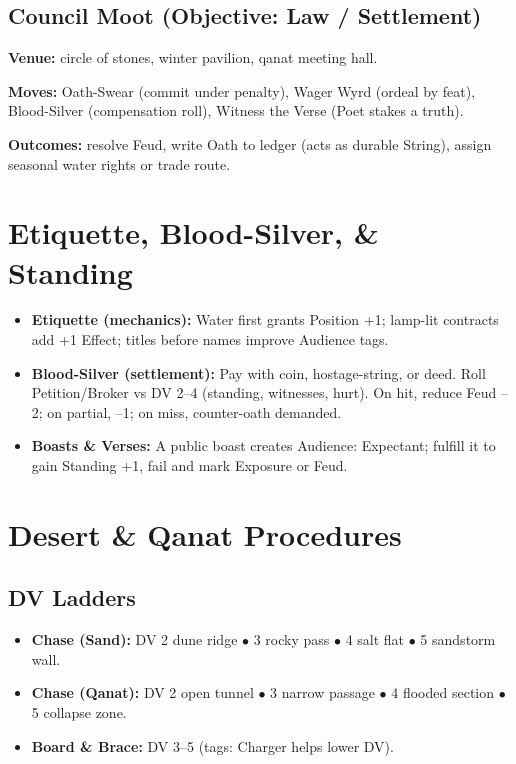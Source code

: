\documentclass[11pt]{article}
\begin{document}
\subsection{Council Moot (Objective: Law / Settlement)}

\textbf{Venue:} circle of stones, winter pavilion, qanat meeting hall.

\textbf{Moves:} Oath-Swear (commit under penalty), Wager Wyrd (ordeal by feat), Blood-Silver (compensation roll), Witness the Verse (Poet stakes a truth).

\textbf{Outcomes:} resolve Feud, write Oath to ledger (acts as durable String), assign seasonal water rights or trade route.

\section{Etiquette, Blood-Silver, \& Standing}
\begin{itemize}
\item \textbf{Etiquette (mechanics):} Water first grants Position +1; lamp-lit contracts add +1 Effect; titles before names improve Audience tags.
\item \textbf{Blood-Silver (settlement):} Pay with coin, hostage-string, or deed. Roll Petition/Broker vs DV 2--4 (standing, witnesses, hurt). On hit, reduce Feud --2; on partial, --1; on miss, counter-oath demanded.
\item \textbf{Boasts \& Verses:} A public boast creates Audience: Expectant; fulfill it to gain Standing +1, fail and mark Exposure or Feud.
\end{itemize}

\section{Desert \& Qanat Procedures}

\subsection{DV Ladders}
\begin{itemize}
\item \textbf{Chase (Sand):} DV 2 dune ridge $\bullet$ 3 rocky pass $\bullet$ 4 salt flat $\bullet$ 5 sandstorm wall.
\item \textbf{Chase (Qanat):} DV 2 open tunnel $\bullet$ 3 narrow passage $\bullet$ 4 flooded section $\bullet$ 5 collapse zone.
\item \textbf{Board \& Brace:} DV 3--5 (tags: Charger helps lower DV).
\end{itemize}
\end{document}
